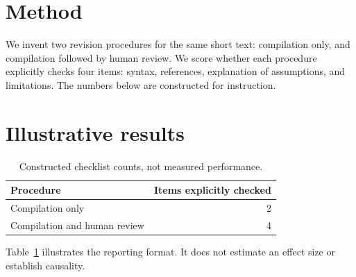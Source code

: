 \section{Method}
We invent two revision procedures for the same short text:
compilation only, and compilation followed by human review.
We score whether each procedure explicitly checks four items:
syntax, references, explanation of assumptions, and limitations.
The numbers below are constructed for instruction.

\section{Illustrative results}
\begin{table}[htbp]
  \centering
  \caption{Constructed checklist counts, not measured performance.}
  \label{tab:checklist}
  \begin{tabular}{lr}
    \toprule
    Procedure & Items explicitly checked \\
    \midrule
    Compilation only & 2 \\
    Compilation and human review & 4 \\
    \bottomrule
  \end{tabular}
\end{table}
Table~\ref{tab:checklist} illustrates the reporting format.
It does not estimate an effect size or establish causality.

